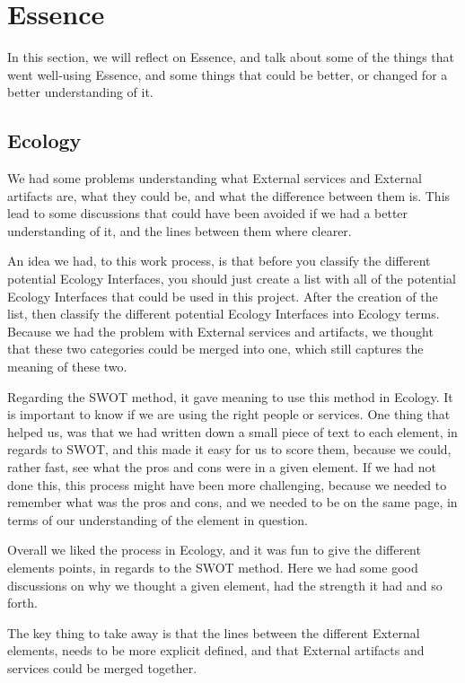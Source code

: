 \section{Essence}\label{sec:eval_essence}
In this section, we will reflect on Essence, and talk about some of the things that went well-using Essence, and some things that could be better, or changed for a better understanding of it.

\subsection{Ecology}
We had some problems understanding what External services and External artifacts are, what they could be, and what the difference between them is.
This lead to some discussions that could have been avoided if we had a better understanding of it, and the lines between them where clearer.

An idea we had, to this work process, is that before you classify the different potential Ecology Interfaces, you should just create a list with all of the potential Ecology Interfaces that could be used in this project.
After the creation of the list, then classify the different potential Ecology Interfaces into Ecology terms.
Because we had the problem with External services and artifacts, we thought that these two categories could be merged into one, which still captures the meaning of these two.

Regarding the SWOT method, it gave meaning to use this method in Ecology. 
It is important to know if we are using the right people or services.
One thing that helped us, was that we had written down a small piece of text to each element, in regards to SWOT, and this made it easy for us to score them, because we could, rather fast, see what the pros and cons were in a given element.
If we had not done this, this process might have been more challenging, because we needed to remember what was the pros and cons, and we needed to be on the same page, in terms of our understanding of the element in question.

Overall we liked the process in Ecology, and it was fun to give the different elements points, in regards to the SWOT method. 
Here we had some good discussions on why we thought a given element, had the strength it had and so forth.

The key thing to take away is that the lines between the different External elements, needs to be more explicit defined, and that External artifacts and services could be merged together.

